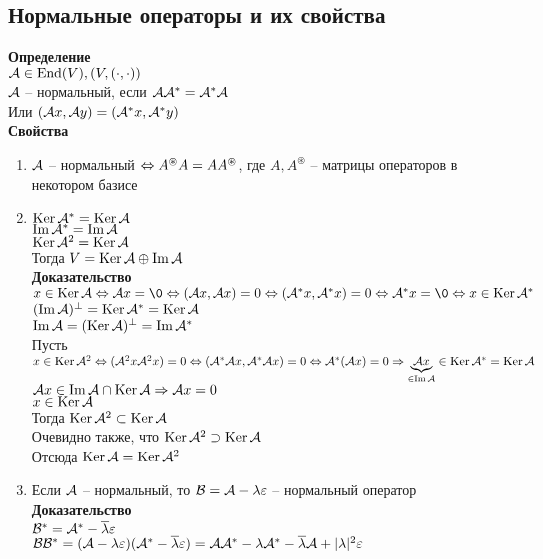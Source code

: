 \documentclass[12pt]{article}
\begin{document}
\subsection{Нормальные операторы и их свойства}
\textbf{Определение}\\
$\mcA \in \nm{End}(V), (V, (\cdot, \cdot))$\\
$\mcA$ -- нормальный, если $\mcA\mcA^* = \mcA^*\mcA$\\
Или $(\mcA x, \mcA y) = (\mcA^* x, \mcA^* y)$\\
\textbf{Свойства}
\begin{enumerate}
    \item $\mcA$ -- нормальный $\LRto A^{\circledast}A = AA^{\circledast} $, где $A, A^{\circledast}$ -- матрицы операторов в некотором базисе
    \item $\ker \mcA^* = \ker \mcA$\\
        $\im \mcA^* = \im \mcA$\\
        $\ker \mcA^2 = \ker \mcA$\\
        Тогда $V = \ker \mcA \oplus \im \mcA $\\
        \textbf{Доказательство}\\
        $x \in \ker \mcA \LRto \mcA x = \0 \LRto (\mcA x, \mcA x) = 0 \LRto (\mcA^* x, \mcA^* x) = 0 \LRto \mcA^* x = \0 \LRto x \in \ker \mcA^*$\\
        $(\im \mcA)^\perp = \ker \mcA^* = \ker \mcA$\\
        $\im \mcA = (\ker \mcA)^\perp = \im \mcA^*$\\
        Пусть $x \in \ker \mcA^2 \LRto (\mcA^2 x \mcA^2 x) = 0 \LRto (\mcA^* \mcA x, \mcA^* \mcA x ) = 0 \LRto \mcA^*(\mcA x) = 0 \Rto \ub{\in \im \mcA}{\mcA x} \in \ker \mcA^* = \ker \mcA$\\
        $\mcA x \in \im \mcA \cap \ker \mcA \Rto \mcA x = 0$\\
        $x \in \ker \mcA$\\
        Тогда $\ker \mcA^2 \subset \ker \mcA$\\
        Очевидно также, что $\ker \mcA^2 \supset \ker \mcA$\\
        Отсюда $\ker \mcA = \ker \mcA^2$
    \item Если $\mcA$ -- нормальный, то $\mcB = \mcA - \lambda \eps$ -- нормальный оператор\\
        \textbf{Доказательство}\\
        $\mcB^* = \mcA^* - \ol\lambda \eps$\\
        $\mcB \mcB^* = (\mcA - \lambda\eps)(\mcA^* - \ol \lambda\eps) = \mcA \mcA^* - \lambda\mcA^* - \ol \lambda\mcA + | \lambda|^2 \eps $\\

\end{enumerate}
\end{document}
